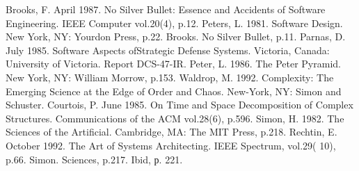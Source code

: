 \begin{thebibliography}{}
	 Brooks, F. April 1987. No Silver Bullet: Essence and Accidents of Software Engineering. IEEE Computer vol.20(4), p.12.  
	 Peters, L. 1981. Software Design. New York, NY: Yourdon Press, p.22. 
	Brooks. No Silver Bullet, p.11. 
	Parnas, D. July 1985. Software Aspects ofStrategic Defense Systems. Victoria, Canada: University of Victoria. Report DCS-47-IR. 
	 Peter, L. 1986. The Peter Pyramid. New York, NY: William Morrow, p.153. 
	 Waldrop, M. 1992. Complexity: The Emerging Science at the Edge of Order and Chaos. New-York, NY: Simon and Schuster. 
	 Courtois, P. June 1985. On Time and Space Decomposition of Complex Structures. Communications of the ACM vol.28(6), p.596. 
	 Simon, H. 1982. The Sciences of the Artificial. Cambridge, MA: The MIT Press, p.218. 
	 Rechtin, E. October 1992. The Art of Systems Architecting. IEEE Spectrum, vol.29( 10), p.66. 
	 Simon. Sciences, p.217. 
	 Ibid, р. 221. 
\end{thebibliography}